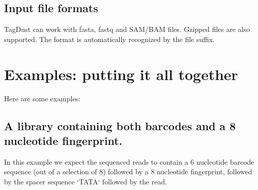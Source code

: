 \documentclass[11pt,a4paper,oneside]{book}
\begin{document}
\subsection{Input file formats}

TagDust can work with fasta, fastq and SAM/BAM files. Gzipped files are also supported. The format is automatically recognized by the file suffix. %
 




%
 

\section{Examples: putting it all together}

Here are some examples: 

\subsection{A library containing both barcodes and a 8 nucleotide fingerprint.}

In this example we expect the sequenced reads to contain a 6 nucleotide barcode sequence (out of a selection of 8) followed by a 8 nucleotide fingerprint, followed by the spacer sequence `TATA` followed by the read. \\
\end{document}
